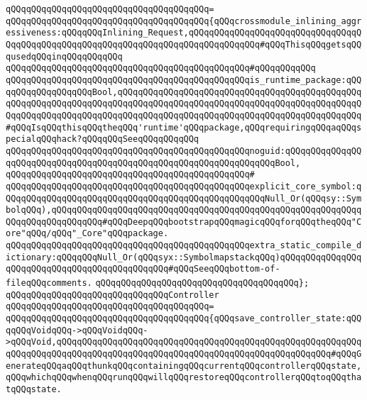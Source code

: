 \verb|qQQqqQQqqQQqqQQqqQQqqQQqqQQqqQQqqQQqqQQq=|\newline
\verb|qQQqqQQqqQQqqQQqqQQqqQQqqQQqqQQqqQQqqQQq{qQQqcrossmodule_inlining_aggressiveness:qQQqqQQqInlining_Request,qQQqqQQqqQQqqQQqqQQqqQQqqQQqqQQqqQQqqQQqqQQqqQQqqQQqqQQqqQQqqQQqqQQqqQQqqQQqqQQqqQQq#qQQqThisqQQqgetsqQQqusedqQQqinqQQqqQQqqQQq|\newline
\verb|qQQqqQQqqQQqqQQqqQQqqQQqqQQqqQQqqQQqqQQqqQQqqQQq#qQQqqQQqqQQq|\newline
\verb|qQQqqQQqqQQqqQQqqQQqqQQqqQQqqQQqqQQqqQQqqQQqqQQqis_runtime_package:qQQqqQQqqQQqqQQqqQQqBool,qQQqqQQqqQQqqQQqqQQqqQQqqQQqqQQqqQQqqQQqqQQqqQQqqQQqqQQqqQQqqQQqqQQqqQQqqQQqqQQqqQQqqQQqqQQqqQQqqQQqqQQqqQQqqQQqqQQqqQQqqQQqqQQqqQQqqQQqqQQqqQQqqQQqqQQqqQQqqQQqqQQqqQQqqQQqqQQqqQQqqQQqqQQq#qQQqIsqQQqthisqQQqtheqQQq'runtime'qQQqpackage,qQQqrequiringqQQqaqQQqspecialqQQqhack?qQQqqQQqSeeqQQqqQQqqQQq|\newline
\verb|qQQqqQQqqQQqqQQqqQQqqQQqqQQqqQQqqQQqqQQqqQQqqQQqnoguid:qQQqqQQqqQQqqQQqqQQqqQQqqQQqqQQqqQQqqQQqqQQqqQQqqQQqqQQqqQQqqQQqqQQqBool,|\newline
\verb|qQQqqQQqqQQqqQQqqQQqqQQqqQQqqQQqqQQqqQQqqQQqqQQq#|\newline
\verb|qQQqqQQqqQQqqQQqqQQqqQQqqQQqqQQqqQQqqQQqqQQqqQQqexplicit_core_symbol:qQQqqQQqqQQqqQQqqQQqqQQqqQQqqQQqqQQqqQQqqQQqqQQqqQQqNull_Or(qQQqsy::SymbolqQQq),qQQqqQQqqQQqqQQqqQQqqQQqqQQqqQQqqQQqqQQqqQQqqQQqqQQqqQQqqQQqqQQqqQQqqQQqqQQqqQQq#qQQqDeepqQQqbootstrapqQQqmagicqQQqforqQQqtheqQQq"Core"qQQq/qQQq"_Core"qQQqpackage.|\newline
\verb|qQQqqQQqqQQqqQQqqQQqqQQqqQQqqQQqqQQqqQQqqQQqqQQqextra_static_compile_dictionary:qQQqqQQqNull_Or(qQQqsyx::SymbolmapstackqQQq)qQQqqQQqqQQqqQQqqQQqqQQqqQQqqQQqqQQqqQQqqQQqqQQq#qQQqSeeqQQqbottom-of-fileqQQqcomments.|\newline
\verb|qQQqqQQqqQQqqQQqqQQqqQQqqQQqqQQqqQQqqQQq};|\newline
\newline
\newline
\verb|qQQqqQQqqQQqqQQqqQQqqQQqqQQqqQQqController|\newline
\verb|qQQqqQQqqQQqqQQqqQQqqQQqqQQqqQQqqQQqqQQq=|\newline
\verb|qQQqqQQqqQQqqQQqqQQqqQQqqQQqqQQqqQQqqQQq{qQQqsave_controller_state:qQQqqQQqVoidqQQq->qQQqVoidqQQq->qQQqVoid,qQQqqQQqqQQqqQQqqQQqqQQqqQQqqQQqqQQqqQQqqQQqqQQqqQQqqQQqqQQqqQQqqQQqqQQqqQQqqQQqqQQqqQQqqQQqqQQqqQQqqQQqqQQqqQQqqQQqqQQqqQQq#qQQqGenerateqQQqaqQQqthunkqQQqcontainingqQQqcurrentqQQqcontrollerqQQqstate,qQQqwhichqQQqwhenqQQqrunqQQqwillqQQqrestoreqQQqcontrollerqQQqtoqQQqthatqQQqstate.|\newline
